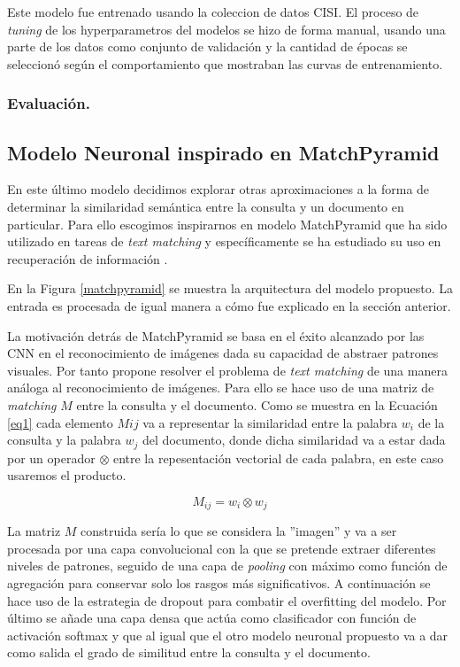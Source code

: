 \documentclass{llncs}
\begin{document}
Este modelo fue entrenado usando la coleccion de datos CISI. El proceso de \textit{tuning} de los hyperparametros del modelos se hizo de forma manual, usando una parte de los datos como conjunto de validación y la cantidad de épocas se seleccionó según el comportamiento que mostraban las curvas de entrenamiento.

\subsubsection{Evaluación.}

\subsection{Modelo Neuronal inspirado en MatchPyramid}

 En este último modelo decidimos explorar otras aproximaciones a la forma de determinar la similaridad semántica entre la consulta y un documento en particular. Para ello escogimos inspirarnos en modelo MatchPyramid \cite{193} que ha sido utilizado en tareas de \textit{text matching} y específicamente se ha estudiado su uso en recuperación de información \cite{194}. 
 
  En la Figura \ref{matchpyramid} se muestra la arquitectura del modelo propuesto. La entrada es procesada de igual manera a cómo fue explicado en la sección anterior.
  
La motivación detrás de MatchPyramid se basa en el éxito alcanzado por las CNN en el reconocimiento de imágenes dada su capacidad de abstraer patrones visuales. Por tanto propone resolver el problema de \textit{text matching} de una manera análoga al reconocimiento de imágenes. Para ello se hace uso de una matriz de \textit{matching} $M$ entre la consulta y el documento. Como se muestra en la Ecuación \ref{eq1} cada elemento $M{ij}$ va a representar la similaridad entre la palabra $w_i$ de la consulta y la palabra $w_j$ del documento, donde dicha similaridad va a estar dada por un operador $\otimes$ entre la repesentación vectorial de cada palabra, en este caso usaremos el producto. 

 \begin{equation}
 \label{eq1}
 M_{ij} = w_i \otimes w_j
 \end{equation} 
  
 La matriz $M$ construida sería lo que se considera la ''imagen'' y va a ser procesada por una capa convolucional con la que se pretende extraer diferentes niveles de patrones, seguido de una capa de \textit{pooling} con máximo como función de agregación para conservar solo los rasgos más significativos. A continuación se hace uso de la estrategia de dropout para combatir el overfitting del modelo. Por último se añade una capa densa que actúa como clasificador con función de activación softmax y que al igual que el otro modelo neuronal propuesto va a dar como salida el grado de similitud entre la consulta y el documento. 
\end{document}
